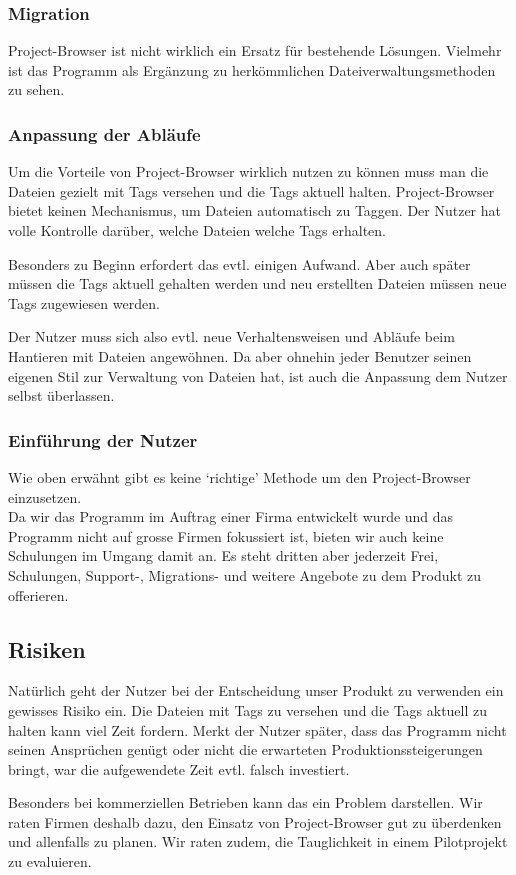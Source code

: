 \documentclass[10pt,paper=a4,final]{scrartcl}
\begin{document}
\subsubsection{Migration}
Project-Browser ist nicht wirklich ein Ersatz für bestehende Lösungen. Vielmehr ist das Programm als Ergänzung zu herkömmlichen Dateiverwaltungsmethoden zu sehen.
\subsubsection{Anpassung der Abl\"aufe}
Um die Vorteile von Project-Browser wirklich nutzen zu können muss man die Dateien gezielt mit Tags versehen und die Tags aktuell halten. Project-Browser bietet keinen Mechanismus, um Dateien automatisch zu Taggen. Der Nutzer hat volle Kontrolle darüber, welche Dateien welche Tags erhalten.

Besonders zu Beginn erfordert das evtl. einigen Aufwand.
Aber auch später müssen die Tags aktuell gehalten werden und neu erstellten Dateien müssen neue Tags zugewiesen werden.

Der Nutzer muss sich also evtl. neue Verhaltensweisen und Abläufe beim Hantieren mit Dateien angewöhnen.
Da aber ohnehin jeder Benutzer seinen eigenen Stil zur Verwaltung von Dateien hat, ist auch die Anpassung dem Nutzer selbst überlassen.
\subsubsection{Einf\"uhrung der Nutzer}
Wie oben erwähnt gibt es keine ‘richtige’ Methode um den Project-Browser einzusetzen.\\
Da wir das Programm im Auftrag einer Firma entwickelt wurde und das Programm nicht auf grosse Firmen fokussiert ist, bieten wir auch keine Schulungen im Umgang damit an.
Es steht dritten aber jederzeit Frei, Schulungen, Support-, Migrations- und weitere Angebote zu dem Produkt zu offerieren.
\subsection{Risiken}
Natürlich geht der Nutzer bei der Entscheidung unser Produkt zu verwenden ein gewisses Risiko ein. Die Dateien mit Tags zu versehen und die Tags aktuell zu halten kann viel Zeit fordern. Merkt der Nutzer später, dass das Programm nicht seinen Ansprüchen genügt oder nicht die erwarteten Produktionssteigerungen bringt, war die aufgewendete Zeit evtl. falsch investiert.

Besonders bei kommerziellen Betrieben kann das ein Problem darstellen. Wir raten Firmen deshalb dazu, den Einsatz von Project-Browser gut zu überdenken und allenfalls zu planen. Wir raten zudem, die Tauglichkeit in einem Pilotprojekt zu evaluieren.
\end{document}
